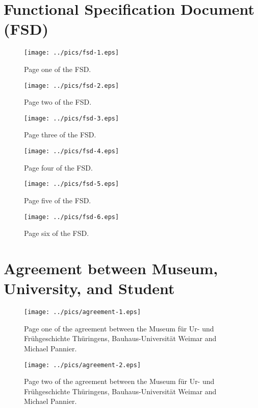 \section{Functional Specification Document (FSD)}
\label{appendix_fsd}
\phantom{a}

\begin{figure}[H]%
\centering
\texttt{[image: ../pics/fsd-1.eps]}%
\caption*{Page one of the FSD.}%
\end{figure}

\begin{figure}[H]%
\centering
\texttt{[image: ../pics/fsd-2.eps]}%
\caption*{Page two of the FSD.}%
\end{figure}

\begin{figure}[H]%
\centering
\texttt{[image: ../pics/fsd-3.eps]}%
\caption*{Page three of the FSD.}%
\end{figure}

\begin{figure}[H]%
\texttt{[image: ../pics/fsd-4.eps]}%
\caption*{Page four of the FSD.}%
\end{figure}

\begin{figure}[H]%
\centering
\texttt{[image: ../pics/fsd-5.eps]}%
\caption*{Page five of the FSD.}%
\end{figure}

\begin{figure}[H]%
\centering
\texttt{[image: ../pics/fsd-6.eps]}%
\caption*{Page six of the FSD.}%
\end{figure}

\newpage
\section{Agreement between Museum, University, and Student}
\label{appendix_agree}

\begin{figure}[H]%
\centering
\texttt{[image: ../pics/agreement-1.eps]}%
\caption*{Page one of the agreement between the Museum für Ur- und Frühgeschichte Thüringens, Bauhaus-Universität Weimar and Michael Pannier.}%
\end{figure}

\begin{figure}[H]%
\centering
\texttt{[image: ../pics/agreement-2.eps]}%
\caption*{Page two of the agreement between the Museum für Ur- und Frühgeschichte Thüringens, Bauhaus-Universität Weimar and Michael Pannier.}%
\end{figure}
